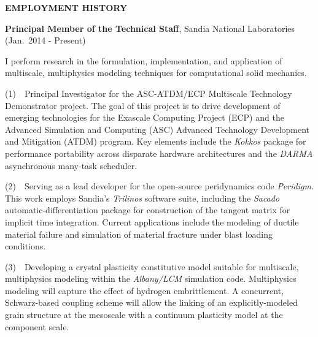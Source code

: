 
\vspace{\sectionskip}
\noindent
{\large \textbf{EMPLOYMENT HISTORY}}
\vspace{\sectionskip}

\begin{minipage}{\minipagewidth}
\textbf{Principal Member of the Technical Staff}, Sandia National Laboratories (Jan.~2014 - Present)
\vspace{0.06in}

I perform research in the formulation, implementation, and application of multiscale, multiphysics modeling techniques for computational solid mechanics.
\vspace{0.06in}

(1)~~Principal Investigator for the ASC-ATDM/ECP Multiscale Technology Demonstrator project.  The goal of this project is to drive development of emerging technologies for the Exascale Computing Project (ECP) and the Advanced Simulation and Computing (ASC) Advanced Technology Development and Mitigation (ATDM) program.  Key elements include the \emph{Kokkos} package for performance portability across disparate hardware architectures and the \emph{DARMA} asynchronous many-task scheduler.
\vspace{0.06in}


(2)~~Serving as a lead developer for the open-source peridynamics code \emph{Peridigm}.  This work employs Sandia's \emph{Trilinos} software suite, including the \emph{Sacado} automatic-differentiation package for construction of the tangent matrix for implicit time integration.  Current applications include the modeling of ductile material failure and simulation of material fracture under blast loading conditions.
\vspace{0.06in}

(3)~~Developing a crystal plasticity constitutive model suitable for multiscale, multiphysics modeling within the \emph{Albany/LCM} simulation code.  Multiphysics modeling will capture the effect of hydrogen embrittlement.  A concurrent, Schwarz-based coupling scheme will allow the linking of an explicitly-modeled grain structure at the mesoscale with a continuum plasticity model at the component scale.
\vspace{0.06in}

\end{minipage}\vspace{\parskip}

